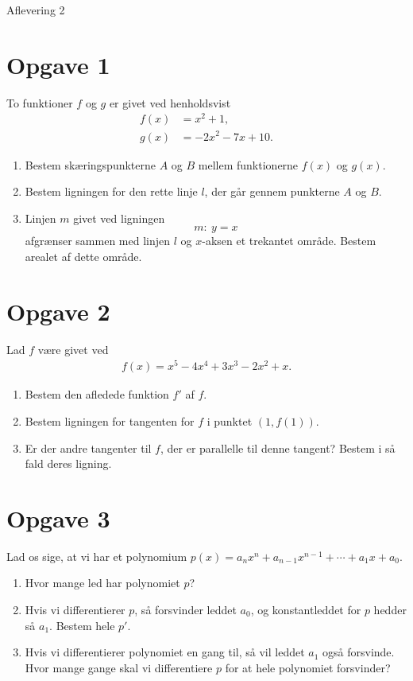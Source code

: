 \begin{center}
\Huge
Aflevering 2
\end{center}
\section*{Opgave 1}
To funktioner $f$ og $g$ er givet ved henholdsvist
\begin{align*}
f(x) &= x^2+1,\\
g(x) &= -2x^2-7x+10.
\end{align*}
\begin{enumerate}[label=\roman*)]
\item Bestem skæringspunkterne $A$ og $B$ mellem funktionerne $f(x)$ og $g(x)$.
\item Bestem ligningen for den rette linje $l$, der går gennem punkterne $A$ og $B$. 
\item Linjen $m$ givet ved ligningen 
\[ m: \ y = x
\]
afgrænser sammen med linjen $l$ og $x$-aksen et trekantet område. Bestem arealet af dette område.
\end{enumerate}

\section*{Opgave 2}
Lad $f$ være givet ved 
\begin{align*}
f(x) = x^5-4x^4+3x^3-2x^2+x.
\end{align*}
\begin{enumerate}[label=\roman*)]
\item Bestem den afledede funktion $f'$ af $f$.
\item Bestem ligningen for tangenten for $f$ i punktet $(1,f(1))$.
\item Er der andre tangenter til $f$, der er parallelle til denne tangent? Bestem i så fald deres ligning.
\end{enumerate}

\section*{Opgave 3}
Lad os sige, at vi har et polynomium $p(x) = a_nx^n + a_{n-1}x^{n-1}+\cdots+a_1x+a_0$.
\begin{enumerate}[label=\roman*)]
\item Hvor mange led har polynomiet $p$?
\item Hvis vi differentierer $p$, så forsvinder leddet $a_0$, og konstantleddet for $p$ hedder så $a_1$. Bestem hele $p'$.
\item Hvis vi differentierer polynomiet en gang til, så vil leddet $a_1$ også forsvinde. Hvor mange gange skal vi differentiere $p$ for at hele polynomiet forsvinder?
\end{enumerate}

